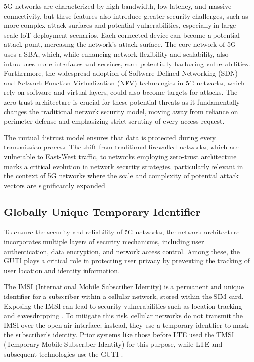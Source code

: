 \documentclass[sigplan,screen]{acmart}
\begin{document}
5G networks are characterized by high bandwidth, low latency, and massive connectivity, but these features also introduce greater security challenges, such as more complex attack surfaces and potential vulnerabilities, especially in large-scale IoT deployment scenarios. Each connected device can become a potential attack point, increasing the network's attack surface. The core network of 5G uses a SBA, which, while enhancing network flexibility and scalability, also introduces more interfaces and services, each potentially harboring vulnerabilities. Furthermore, the widespread adoption of Software Defined Networking (SDN) and Network Function Virtualization (NFV) technologies in 5G networks, which rely on software and virtual layers, could also become targets for attacks. The zero-trust architecture is crucial for these potential threats as it fundamentally changes the traditional network security model, moving away from reliance on perimeter defense and emphasizing strict scrutiny of every access request.

The mutual distrust model ensures that data is protected during every transmission process. The shift from traditional firewalled networks, which are vulnerable to East-West traffic, to networks employing zero-trust architecture marks a critical evolution in network security strategies, particularly relevant in the context of 5G networks where the scale and complexity of potential attack vectors are significantly expanded.

\subsection{Globally Unique Temporary Identifier}
To ensure the security and reliability of 5G networks, the network architecture incorporates multiple layers of security mechanisms, including user authentication, data encryption, and network access control. Among these, the GUTI plays a critical role in protecting user privacy by preventing the tracking of user location and identity information.

The IMSI (International Mobile Subscriber Identity) is a permanent and unique identifier for a subscriber within a cellular network, stored within the SIM card. Exposing the IMSI can lead to security vulnerabilities such as location tracking and eavesdropping \cite{3gpp23003}. To mitigate this risk, cellular networks do not transmit the IMSI over the open air interface; instead, they use a temporary identifier to mask the subscriber's identity. Prior systems like those before LTE used the TMSI (Temporary Mobile Subscriber Identity) for this purpose, while LTE and subsequent technologies use the GUTI \cite{goodin2013body}.
\end{document}
